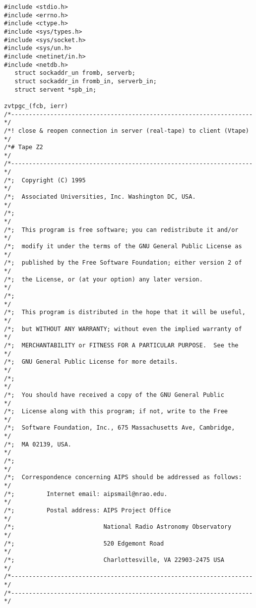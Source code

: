\begin{center}
\begin{verbatim}
#include <stdio.h>
#include <errno.h>
#include <ctype.h>
#include <sys/types.h>
#include <sys/socket.h>
#include <sys/un.h>
#include <netinet/in.h>
#include <netdb.h>
   struct sockaddr_un fromb, serverb;
   struct sockaddr_in fromb_in, serverb_in;
   struct servent *spb_in;

zvtpgc_(fcb, ierr)
/*--------------------------------------------------------------------*/
/*! close & reopen connection in server (real-tape) to client (Vtape) */
/*# Tape Z2                                                           */
/*--------------------------------------------------------------------*/
/*;  Copyright (C) 1995                                               */
/*;  Associated Universities, Inc. Washington DC, USA.                */
/*;                                                                   */
/*;  This program is free software; you can redistribute it and/or    */
/*;  modify it under the terms of the GNU General Public License as   */
/*;  published by the Free Software Foundation; either version 2 of   */
/*;  the License, or (at your option) any later version.              */
/*;                                                                   */
/*;  This program is distributed in the hope that it will be useful,  */
/*;  but WITHOUT ANY WARRANTY; without even the implied warranty of   */
/*;  MERCHANTABILITY or FITNESS FOR A PARTICULAR PURPOSE.  See the    */
/*;  GNU General Public License for more details.                     */
/*;                                                                   */
/*;  You should have received a copy of the GNU General Public        */
/*;  License along with this program; if not, write to the Free       */
/*;  Software Foundation, Inc., 675 Massachusetts Ave, Cambridge,     */
/*;  MA 02139, USA.                                                   */
/*;                                                                   */
/*;  Correspondence concerning AIPS should be addressed as follows:   */
/*;         Internet email: aipsmail@nrao.edu.                        */
/*;         Postal address: AIPS Project Office                       */
/*;                         National Radio Astronomy Observatory      */
/*;                         520 Edgemont Road                         */
/*;                         Charlottesville, VA 22903-2475 USA        */
/*--------------------------------------------------------------------*/
/*--------------------------------------------------------------------*/

\end{verbatim}
\end{center}
